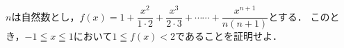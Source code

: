 \documentclass[../../main.tex]{subfiles}
\begin{document}
$n$は自然数とし，$\displaystyle f(x)=1+\dfrac{x^2}{1\cdot2}+\dfrac{x^3}{2\cdot3}+\cdots\cdots+
\dfrac{x^{n+1}}{n(n+1)}$とする．
このとき，$-1 \leqq x \leqq 1$において$1 \leqq f(x)<2$であることを証明せよ．
\end{document}
